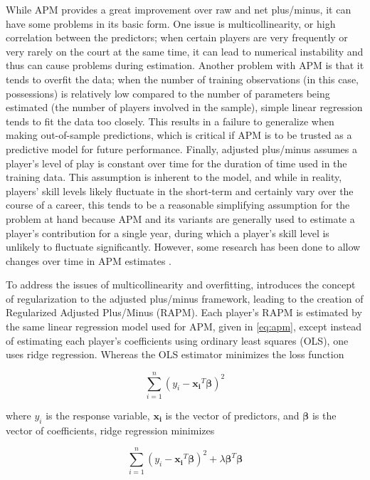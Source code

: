 While APM provides a great improvement over raw and net plus/minus, it can have some
problems in its basic form. One issue is multicollinearity, or high correlation
between the predictors; when certain players are very frequently or very rarely on
the court at the same time, it can lead to numerical instability and thus can cause
problems during estimation. Another problem with APM is that it tends to overfit the
data; when the number of training observations (in this case, possessions) is
relatively low compared to the number of parameters being estimated (the number of
players involved in the sample), simple linear regression tends to fit the data too
closely. This results in a failure to generalize when making out-of-sample
predictions, which is critical if APM is to be trusted as a predictive model
for future performance. Finally, adjusted plus/minus assumes a player's level of
play is constant over time for the duration of time used in the training data. This
assumption is inherent to the model, and while in reality, players' skill levels
likely fluctuate in the short-term and certainly vary over the course of a career,
this tends to be a reasonable simplifying assumption for the problem at hand because
APM and its variants are generally used to estimate a player's contribution for a
single year, during which a player's skill level is unlikely to fluctuate
significantly. However, some research has been done to allow changes over time in
APM estimates \cite{Fearnhead}.

To address the issues of multicollinearity and overfitting, \citet{Sill}
introduces the concept of regularization to the adjusted plus/minus framework,
leading to the creation of Regularized Adjusted Plus/Minus (RAPM). Each player’s
RAPM is estimated by the same linear regression model used for APM, given in
\eqref{eq:apm}, except instead of estimating each player’s coefficients using
ordinary least squares (OLS), one uses ridge regression. Whereas the OLS estimator
minimizes the loss function

\begin{equation} \label{eq:ols_loss}
    \sum_{i=1}^n \left( y_i - \bm{x_i}^T\bm{\beta} \right)^2
\end{equation}

where $y_i$ is the response variable, $\bm{x_i}$ is the vector of predictors, and
$\bm{\beta}$ is the vector of coefficients, ridge regression minimizes

\begin{equation} \label{eq:ridge_loss}
    \sum_{i=1}^n \left( y_i - \bm{x_i}^T\bm{\beta} \right)^2 + \lambda
    \bm{\beta}^T\bm{\beta}
\end{equation}


